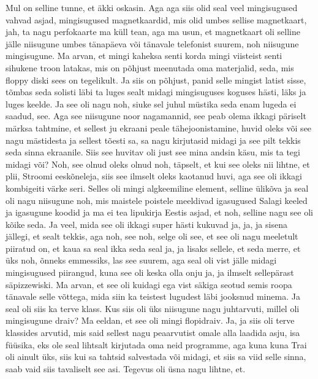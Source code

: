 Mul on selline tunne, et äkki oskasin.
Aga aga siis olid seal veel mingisugused vahvad asjad, mingisugused magnetkaardid, mis olid umbes sellise magnetkaart, jah, ta nagu perfokaarte ma küll tean, aga ma usun, et magnetkaart oli selline jälle niisugune umbes tänapäeva või tänavale telefonist suurem, noh niisugune mingisugune. Ma arvan, et mingi kaheksa senti korda mingi viisteist senti sihukene troon latakas, mis on põhjust meenutada oma materjalid, seda, mis floppy diski sees on tegelikult. Ja siis on põhjust, panid selle mingist latist sisse, tõmbas seda solisti läbi ta luges sealt midagi mingisuguses koguses hästi, läks ja luges keelde. Ja see oli nagu noh, siuke sel juhul müstika seda enam lugeda ei saadud, see. Aga see niisugune noor nagamannid, see peab olema ikkagi päriselt märksa tahtmine, et sellest ju ekraani peale tähejoonistamine, huvid oleks või see nagu mästidesta ja sellest tõesti sa, sa nagu kirjutasid midagi ja see pilt tekkis seda sinna ekraanile. Siis see huvitav oli just see mina andsin käsu, mis ta tegi midagi või? Noh, see olnud oleks olnud noh, täpselt, et kui see oleks nii lihtne, et plii, Stroomi eeskõneleja, siis see ilmselt oleks kaotanud huvi, aga see oli ikkagi kombigeiti värke seri. Selles oli mingi algkeemiline element, selline ülikõva ja seal oli nagu niisugune noh, mis maistele poistele meeldivad igasugused Salagi keeled ja igasugune koodid ja ma ei tea lipukirja Eestis asjad, et noh, selline nagu see oli kõike seda. Ja veel, mida see oli ikkagi super hästi kukuvad ja, ja, ja sisena jällegi, et sealt tekkis, aga noh, see noh, selge oli see, et see oli nagu meeletult piiratud on, et kaua sa seal ikka seda seal ja, ja lisaks sellele, et seda merre, et üks noh, õnneks emmessiks, las see suurem, aga seal oli vist jälle midagi mingisugused piirangud, kuna see oli keska olla onju ja, ja ilmselt sellepärast säpizzewiski. Ma arvan, et see oli kuidagi ega vist säkiga seotud semis roopa tänavale selle võttega, mida siin ka teistest lugudest läbi jooksnud minema. Ja seal oli siis ka terve klass.
Kus siis oli üks niisugune nagu juhtarvuti, millel oli mingisugune draiv? Ma eeldan, et see oli mingi flopidraiv. Ja, ja siis oli terve klassides arvutid, mis said sellest nagu peaarvutist omale alla laadida asju, isa füüsika, eks ole seal lihtsalt kirjutada oma neid programme, aga kuna kuna Trai oli ainult üks, siis kui sa tahtsid salvestada või midagi, et siis sa viid selle sinna, saab vaid siis tavaliselt see asi. Tegevus oli üsna nagu lihtne, et.
